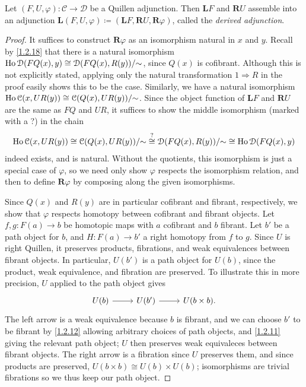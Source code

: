 \begin{lemma}\label{3.2.11}
	Let $(F,U,\varphi): \mathcal{C}  \to \mathcal{D} $ be a Quillen adjunction. Then $\mathbf{L} F$ and $\mathbf{R} U$ assemble into an adjunction $\mathbf{L} (F,U,\varphi)\coloneqq (\mathbf{L} F,\mathbf{R} U,\mathbf{R} \varphi)$, called the \emph{derived adjunction}.
\end{lemma}
\begin{proof}
	It suffices to construct $\mathbf{R} \varphi$ as an isomorphism natural in $x$ and $y$. Recall by \cref{1.2.18} that there is a natural isomorphism $\operatorname{Ho} \mathcal{D} (FQ(x),y)\cong \mathcal{D}(FQ(x),R(y)) / \mathbin{\sim} $, since $Q(x)$ is cofibrant. Although this is not explicitly stated, applying only the natural transformation $1\Rightarrow R$ in the proof easily shows this to be the case. Similarly, we have a natural isomorphism $\operatorname{Ho} \mathcal{C} (x,UR(y))\cong \mathcal{C} (Q(x),UR(y)) / \mathbin{\sim} $. Since the object function of $\mathbf{L} F$ and $\mathbf{R} U$ are the same as $FQ$ and $UR$, it suffices to show the middle isomorphism (marked with a ?) in the chain
	\[
		\operatorname{Ho} \mathcal{C} (x,UR(y))\cong \mathcal{C} (Q(x),UR(y)) / \mathbin{\sim} \overset{?}{\cong} \mathcal{D} (FQ(x),R(y)) / \mathbin{\sim} \cong \operatorname{Ho} \mathcal{D} (FQ(x),y)
	\]
	indeed exists, and is natural. Without the quotients, this isomorphism is just a special case of $\varphi$, so we need only show $\varphi$ respects the isomorphism relation, and then to define $\mathbf{R} \varphi$ by composing along the given isomorphisms.

	Since $Q(x)$ and $R(y)$ are in particular cofibrant and fibrant, respectively, we show that $\varphi$ respects homotopy between cofibrant and fibrant objects. Let $f,g : F(a) \to b$ be homotopic maps with $a$ cofibrant and $b$ fibrant. Let $b'$ be a path object for $b$, and $H : F(a) \to b'$ a right homotopy from $f$ to $g$. Since $U$ is right Quillen, it preserves products, fibrations, and weak equivalences between fibrant objects. In particular, $U(b')$ is a path object for $U(b)$, since the product, weak equivalence, and fibration are preserved. To illustrate this in more precision, $U$ applied to the path object gives
	\[\begin{tikzcd}[row sep = 2.5em, column sep = 2.5em]
	U(b)\ar[r]  & U(b')\ar[r]  & U(b\times b).
	\end{tikzcd}\]
	The left arrow is a weak equivalence because $b$ is fibrant, and we can choose $b'$ to be fibrant by \cref{1.2.12} allowing arbitrary choices of path objects, and \cref{1.2.11} giving the relevant path object; $U$ then preserves weak equivaleces between fibrant objects. The right arrow is a fibration since $U$ preserves them, and since products are preserved, $U(b\times b)\cong U(b)\times U(b)$; isomorphisms are trivial fibrations so we thus keep our path object.


\end{proof}

